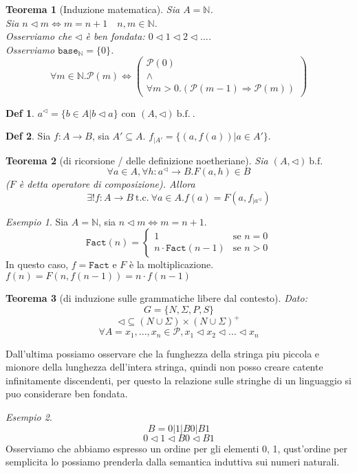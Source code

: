 \documentclass[a4paper]{report}
\newcommand{\bnfn}{\ \mathrm{b.f.}\ }
\newcommand{\tc}{\ \mathrm{t.c.}\ }
\newcommand{\prop}{\mathcal{P}}
\newcommand{\base}[1]{\mathtt{base}_{#1}}
\theoremstyle{definition} \newtheorem*{defi}{Def}
\theoremstyle{plain} \newtheorem{lemma}{Lemma}
\theoremstyle{plain} \newtheorem{teo}{Teorema}
\theoremstyle{remark} \newtheorem*{es}{Esempio}
\begin{document}
\begin{teo}[Induzione matematica]
  Sia $A=\mathbb{N}$.\\
  Sia $n \lhd m \Leftrightarrow m=n+1 \quad n,m \in \mathbb{N}$.\\
  Osserviamo che $\lhd$ è ben fondata: $0\lhd1\lhd2\lhd\dots$.\\
  Osserviamo $\base{\mathbb{N}}=\{0\}$.
  \[
    \forall m \in \mathbb{N}.\prop(m) \Leftrightarrow 
    \begin{pmatrix} 
      \prop(0)\\
      \wedge\\
      \forall m > 0
      .(\prop(m-1) \Rightarrow \prop(m))
    \end{pmatrix}
  \]
\end{teo}

\begin{defi}
  $a^\lhd=\{b \in A|b \lhd a\}$ con $(A,\lhd)\bnfn$.
\end{defi}
\begin{defi}
  Sia $f: A \rightarrow B$, sia $A' \subseteq A$.
  $f_{|A'}=\{(a, f(a))|a \in A'\}$.
\end{defi}

\begin{teo}[di ricorsione / delle definizione noetheriane]
  Sia $(A,\lhd)\bnfn$
  \[
    \forall a \in A, \forall h:a^\lhd \rightarrow B.
    F(a,h) \in B
  \]
  ($F$ è detta \emph{operatore di composizione}). Allora
  \[
    \exists! f: A \rightarrow B \tc
    \forall a \in A.f(a)=F(a,f_{|a^\lhd})
  \]
\end{teo}
\begin{es}
  Sia $A=\mathbb{N}$, sia $n \lhd m \Leftrightarrow m=n+1$.\\
  \[
    \mathtt{Fact}(n)=
    \begin{cases}
      1 & \text{se } n=0\\
      n \cdot \mathtt{Fact}(n-1) & \text{se } n>0
    \end{cases}
  \]
  In questo caso, $f = \mathtt{Fact}$ e $F$ è la moltiplicazione.\\
  $f(n)=F(n,f(n-1))=n \cdot f(n-1)$
\end{es}
\newpage{}
\begin{teo}[di induzione sulle grammatiche libere dal contesto] 
  Dato:
  \[
    G = \{N, \Sigma, P, S\}
  \]
  \[
    \lhd \subseteq (N \cup \Sigma) \times (N \cup \Sigma)^+
  \]
  \[
    \forall A = x_1,...,x_n \in \prop, x_1 \lhd x_2 \lhd ... \lhd x_n
  \]
\end{teo}
  Dall'ultima possiamo osservare che la funghezza della stringa piu piccola e mionore della lunghezza dell'intera stringa, quindi non posso creare catente infinitamente discendenti, per questo la relazione sulle stringhe di un linguaggio si puo considerare ben fondata.
\begin{es}
  \[
    B = 0|1|B0|B1
  \]
  \[
    0 \lhd 1 \lhd B0 \lhd B1
  \]
  Osserviamo che abbiamo espresso un ordine per gli elementi 0, 1, qust'ordine per semplicita lo possiamo prenderla dalla semantica induttiva sui numeri naturali.
\end{es}
\end{document}
